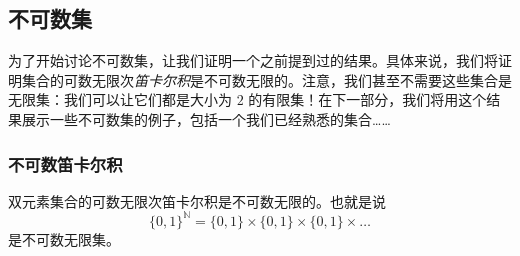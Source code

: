 
\subsection{不可数集}

为了开始讨论不可数集，让我们证明一个之前提到过的结果。具体来说，我们将证明集合的可数无限次\emph{笛卡尔积}是不可数无限的。注意，我们甚至不需要这些集合是无限集：我们可以让它们都是大小为 $2$ 的有限集！在下一部分，我们将用这个结果展示一些不可数集的例子，包括一个我们已经熟悉的集合……

\subsubsection*{不可数笛卡尔积}

\begin{theorem}
    双元素集合的可数无限次笛卡尔积是不可数无限的。也就是说
    \[\{0, 1\}^{\mathbb{N}} = \{0, 1\} \times \{0, 1\} \times \{0, 1\} \times \dots\]
    是不可数无限集。
\end{theorem}

